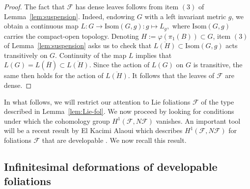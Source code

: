 \documentclass[11pt, letterpaper, oneside,reqno]{amsart}
\theoremstyle{plain}
\theoremstyle{underline}
\theoremstyle{definition}
\theoremstyle{remark}
\begin{document}
\begin{proof}
		The fact that $\mathcal{F}$ has dense leaves follows from item $(3)$ of Lemma~\ref{lem:suspension}. Indeed, endowing $G$ with a left invariant metric $g$, we obtain a continuous map
		$
		L:G\rightarrow\text{Isom}(G,g):g\mapsto L_{g},
		$
		where $\text{Isom}(G,g)$ carries the compact-open topology. Denoting $H:=\varphi(\pi_1(B))\subset G$, item $(3)$ of Lemma~\ref{lem:suspension} asks us to check that $\overline{L(H)}\subset\text{Isom}(G,g)$ acts transitively on $G$. Continuity of the map $L$ implies that
		$
		L(G)=L(\overline{H})\subset \overline{L(H)}.
		$
		Since the action of $L(G)$ on $G$ is transitive, the same then holds for the action of $\overline{L(H)}$. It follows that the leaves of $\mathcal{F}$ are dense.
	\end{proof}
	
	
	In what follows, we will restrict our attention to Lie foliations $\mathcal{F}$ of the type described in Lemma~\ref{lem:Lie-fol}. We now proceed by looking for conditions under which the cohomology group $H^{1}(\mathcal{F},N\mathcal{F})$ vanishes. An important tool will be a recent result by El Kacimi Alaoui which describes $H^{1}(\mathcal{F},N\mathcal{F})$ for foliations $\mathcal{F}$ that are developable \cite{Kacimi}. We now recall this result.
	
	\subsection{Infinitesimal deformations of developable foliations}
	
\end{document}
